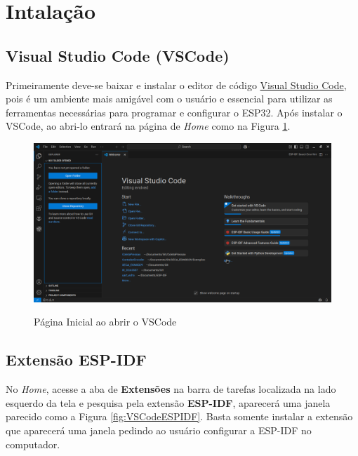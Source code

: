 \section{Intalação}

\subsection{Visual Studio Code (VSCode)}

\tab
Primeiramente deve-se baixar e instalar o editor de código 
\href{https://code.visualstudio.com/}{Visual Studio Code},
pois é um ambiente mais amigável com o usuário e essencial
para utilizar as ferramentas necessárias para programar e configurar
o ESP32. Após instalar o VSCode, ao abri-lo entrará 
na página de \textit{Home} como na Figura \ref{fig:VSCodeHome}.

\begin{figure}[!ht]
    \centering
    \caption{Página Inicial ao abrir o VSCode}
    \vspace{0.2cm}
    \includegraphics[scale=0.2]{img/VSCodeHome.png}
    \label{fig:VSCodeHome}
\end{figure}

\subsection{Extensão ESP-IDF}

\tab
No \textit{Home}, acesse a aba de \textbf{Extensões} na barra
de tarefas localizada na lado esquerdo da tela e pesquisa
pela extensão \textbf{ESP-IDF}, aparecerá uma janela parecido
como a Figura \ref{fig:VSCodeESPIDF}. Basta somente instalar a
extensão que aparecerá uma janela pedindo ao usuário configurar
a ESP-IDF no computador.

